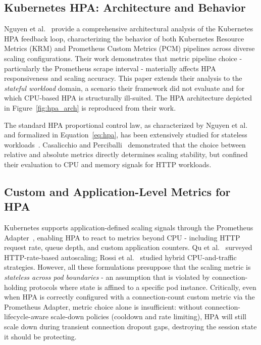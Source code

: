 \documentclass[twocolumn]{svjour3}
\begin{document}
\subsection{Kubernetes HPA: Architecture and Behavior}

Nguyen et al.~\cite{nguyen2020hpa} provide a comprehensive architectural analysis of the Kubernetes HPA feedback loop, characterizing the behavior of both Kubernetes Resource Metrics (KRM) and Prometheus Custom Metrics (PCM) pipelines across diverse scaling configurations. Their work demonstrates that metric pipeline choice - particularly the Prometheus scrape interval - materially affects HPA responsiveness and scaling accuracy. This paper extends their analysis to the \textit{stateful workload} domain, a scenario their framework did not evaluate and for which CPU-based HPA is structurally ill-suited. The HPA architecture depicted in Figure~\ref{fig:hpa_arch} is reproduced from their work.

The standard HPA proportional control law, as characterized by Nguyen et al.~\cite{nguyen2020hpa} and formalized in Equation~\ref{eq:hpa}, has been extensively studied for stateless workloads~\cite{casalicchio2019auto,lorido2014auto}. Casalicchio and Perciballi~\cite{casalicchio2019auto} demonstrated that the choice between relative and absolute metrics directly determines scaling stability, but confined their evaluation to CPU and memory signals for HTTP workloads.

\subsection{Custom and Application-Level Metrics for HPA}

Kubernetes supports application-defined scaling signals through the Prometheus Adapter~\cite{prometheus_adapter}, enabling HPA to react to metrics beyond CPU - including HTTP request rate, queue depth, and custom application counters. Qu et al.~\cite{qu2018auto} surveyed HTTP-rate-based autoscaling; Rossi et al.~\cite{rossi2020horizontal} studied hybrid CPU-and-traffic strategies. However, all these formulations presuppose that the scaling metric is \textit{stateless across pod boundaries} - an assumption that is violated by connection-holding protocols where state is affined to a specific pod instance. Critically, even when HPA is correctly configured with a connection-count custom metric via the Prometheus Adapter, metric choice alone is insufficient: without connection-lifecycle-aware scale-down policies (cooldown and rate limiting), HPA will still scale down during transient connection dropout gaps, destroying the session state it should be protecting.
\end{document}
